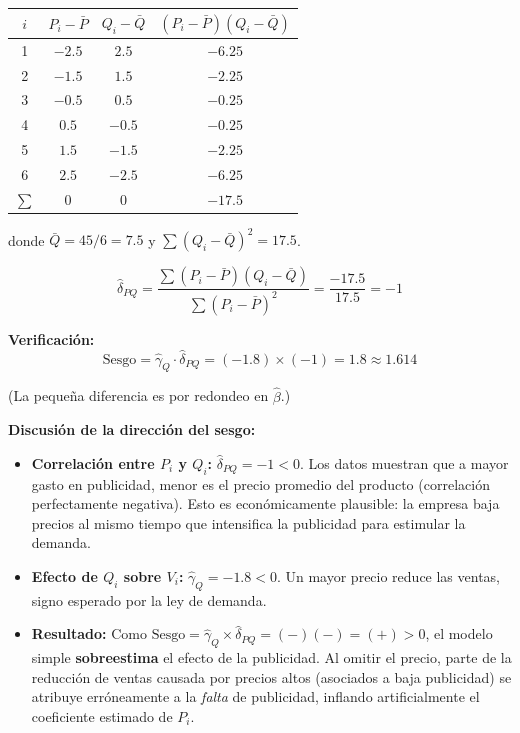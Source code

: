 \documentclass[10pt,a4paper]{article}
\begin{document}
\begin{enumerate}
\begin{enumerate}[label=(\alph*)]
{\begin{enumerate}[label=(\alph*)]
\begin{center}
\begin{tabular}{cccc}
\toprule
$i$ & $P_i - \bar{P}$ & $Q_i - \bar{Q}$ & $(P_i-\bar{P})(Q_i-\bar{Q})$ \\
\midrule
1 & $-2.5$ & $2.5$  & $-6.25$ \\
2 & $-1.5$ & $1.5$  & $-2.25$ \\
3 & $-0.5$ & $0.5$  & $-0.25$ \\
4 & $0.5$  & $-0.5$ & $-0.25$ \\
5 & $1.5$  & $-1.5$ & $-2.25$ \\
6 & $2.5$  & $-2.5$ & $-6.25$ \\
\midrule
$\sum$ & 0 & 0 & $-17.5$ \\
\bottomrule
\end{tabular}
\end{center}
 
donde $\bar{Q} = 45/6 = 7.5$ y $\sum(Q_i-\bar{Q})^2 = 17.5$.
 
\[
\hat{\delta}_{PQ}
= \frac{\sum(P_i-\bar{P})(Q_i-\bar{Q})}{\sum(P_i-\bar{P})^2}
= \frac{-17.5}{17.5} = -1
\]
 
\textbf{Verificación:}
\[
\text{Sesgo} = \hat{\gamma}_Q \cdot \hat{\delta}_{PQ}
= (-1.8) \times (-1) = 1.8 \approx 1.614
\]
 
(La pequeña diferencia es por redondeo en $\hat{\beta}$.)
 
\medskip
\textbf{Discusión de la dirección del sesgo:}
 
\begin{itemize}
  \item \textbf{Correlación entre $P_i$ y $Q_i$:} $\hat{\delta}_{PQ} = -1 < 0$.
  Los datos muestran que a mayor gasto en publicidad, menor es el precio promedio del
  producto (correlación perfectamente negativa). Esto es económicamente plausible: la
  empresa baja precios al mismo tiempo que intensifica la publicidad para estimular
  la demanda.
 
  \item \textbf{Efecto de $Q_i$ sobre $V_i$:} $\hat{\gamma}_Q = -1.8 < 0$.
  Un mayor precio reduce las ventas, signo esperado por la ley de demanda.
 
  \item \textbf{Resultado:} Como $\text{Sesgo} = \hat{\gamma}_Q \times \hat{\delta}_{PQ}
  = (-)(-) = (+) > 0$, el modelo simple \textbf{sobreestima} el efecto de la publicidad.
  Al omitir el precio, parte de la reducción de ventas causada por precios altos
  (asociados a baja publicidad) se atribuye erróneamente a la \emph{falta} de publicidad,
  inflando artificialmente el coeficiente estimado de $P_i$.
\end{itemize}
 

\end{enumerate}}
\end{enumerate}
\end{enumerate}
\end{document}
